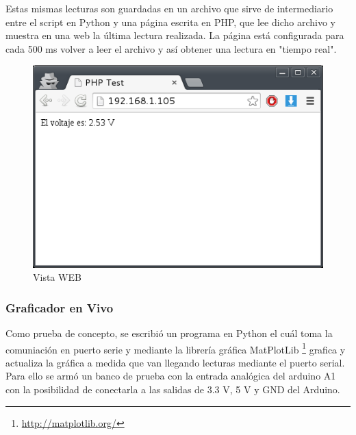 \documentclass[12pt,a4paper]{article}
\begin{document}
			Estas mismas lecturas son guardadas en un archivo que sirve de intermediario entre el script en Python y una página escrita en PHP, que lee dicho archivo y muestra en una web la última lectura realizada. La página está configurada para cada 500 ms volver a leer el archivo y así obtener una lectura en "tiempo real".

			\begin{figure}[H]
			\centering
				\includegraphics[scale=0.7]{images/Screenshot4.png}\caption{Vista WEB}
			\end{figure}

			\subsubsection{Graficador en Vivo}
				Como prueba de concepto, se escribió un programa en Python el cuál toma la comuniación en puerto serie y mediante la librería gráfica MatPlotLib \footnote{\url{http://matplotlib.org/}} grafica y actualiza la gráfica a medida que van llegando lecturas mediante el puerto serial. Para ello se armó un banco de prueba con la entrada analógica del arduino A1 con la posibilidad de conectarla a las salidas de 3.3 V, 5 V y GND del Arduino.
\end{document}
